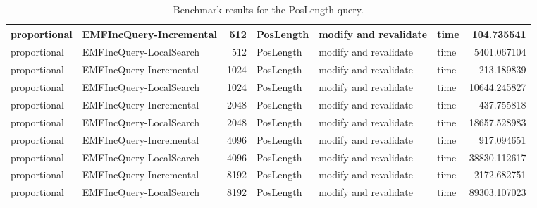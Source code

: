 \begin{table}
\begin{tabular}{| l | l | r | l | l | l | r |}
proportional & EMFIncQuery-Incremental & 512 & PosLength & modify and revalidate & time & 104.735541\\\hline
proportional & EMFIncQuery-LocalSearch & 512 & PosLength & modify and revalidate & time & 5401.067104\\\hline
proportional & EMFIncQuery-Incremental & 1024 & PosLength & modify and revalidate & time & 213.189839\\\hline
proportional & EMFIncQuery-LocalSearch & 1024 & PosLength & modify and revalidate & time & 10644.245827\\\hline
proportional & EMFIncQuery-Incremental & 2048 & PosLength & modify and revalidate & time & 437.755818\\\hline
proportional & EMFIncQuery-LocalSearch & 2048 & PosLength & modify and revalidate & time & 18657.528983\\\hline
proportional & EMFIncQuery-Incremental & 4096 & PosLength & modify and revalidate & time & 917.094651\\\hline
proportional & EMFIncQuery-LocalSearch & 4096 & PosLength & modify and revalidate & time & 38830.112617\\\hline
proportional & EMFIncQuery-Incremental & 8192 & PosLength & modify and revalidate & time & 2172.682751\\\hline
proportional & EMFIncQuery-LocalSearch & 8192 & PosLength & modify and revalidate & time & 89303.107023\\\hline

\end{tabular}\caption{Benchmark results for the \textsf{PosLength} query.}
\label{tab:revalidation-poslength}
\end{table}
